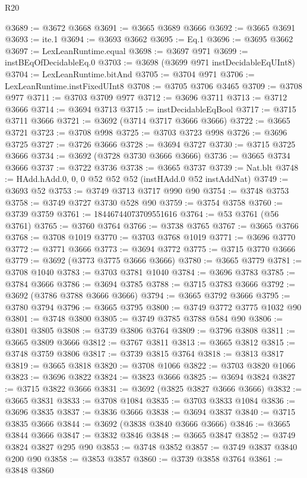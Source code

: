 \begin{lexlean}{R20}
\begin{coremodule}
@3689 := @3672 @3668
@3691 := @3665 @3689 @3666
@3692 := @3665 @3691
@3693 := ite.{1}
@3694 := @3693 @3662
@3695 := Eq.{1}
@3696 := @3695 @3662
@3697 := LexLeanRuntime.equal
@3698 := @3697 @971
@3699 := instBEqOfDecidableEq.{0}
@3703 := @3698 (@3699 @971 instDecidableEqUInt8)
@3704 := LexLeanRuntime.bitAnd
@3705 := @3704 @971
@3706 := LexLeanRuntime.instFixedUInt8
@3708 := @3705 @3706 @3465
@3709 := @3708 @977
@3711 := @3703 @3709 @977
@3712 := @3696 @3711
@3713 := @3712 @3666
@3714 := @3694 @3713
@3715 := instDecidableEqBool
@3717 := @3715 @3711 @3666
@3721 := @3692 (@3714 @3717 @3666 @3666)
@3722 := @3665 @3721
@3723 := @3708 @998
@3725 := @3703 @3723 @998
@3726 := @3696 @3725
@3727 := @3726 @3666
@3728 := @3694 @3727
@3730 := @3715 @3725 @3666
@3734 := @3692 (@3728 @3730 @3666 @3666)
@3736 := @3665 @3734 @3666
@3737 := @3722 @3736
@3738 := @3665 @3737
@3739 := Nat.blt
@3748 := HAdd.hAdd.{0, 0, 0} @52 @52 @52 (instHAdd.{0} @52 instAddNat)
@3749 := @3693 @52
@3753 := @3749 @3713 @3717 @990 @90
@3754 := @3748 @3753
@3758 := @3749 @3727 @3730 @528 @90
@3759 := @3754 @3758
@3760 := @3739 @3759
@3761 := 18446744073709551616
@3764 := @53 @3761 (@56 @3761)
@3765 := @3760 @3764
@3766 := @3738 @3765
@3767 := @3665 @3766
@3768 := @3708 @1019
@3770 := @3703 @3768 @1019
@3771 := @3696 @3770
@3772 := @3771 @3666
@3773 := @3694 @3772
@3775 := @3715 @3770 @3666
@3779 := @3692 (@3773 @3775 @3666 @3666)
@3780 := @3665 @3779
@3781 := @3708 @1040
@3783 := @3703 @3781 @1040
@3784 := @3696 @3783
@3785 := @3784 @3666
@3786 := @3694 @3785
@3788 := @3715 @3783 @3666
@3792 := @3692 (@3786 @3788 @3666 @3666)
@3794 := @3665 @3792 @3666
@3795 := @3780 @3794
@3796 := @3665 @3795
@3800 := @3749 @3772 @3775 @1032 @90
@3801 := @3748 @3800
@3805 := @3749 @3785 @3788 @584 @90
@3806 := @3801 @3805
@3808 := @3739 @3806 @3764
@3809 := @3796 @3808
@3811 := @3665 @3809 @3666
@3812 := @3767 @3811
@3813 := @3665 @3812
@3815 := @3748 @3759 @3806
@3817 := @3739 @3815 @3764
@3818 := @3813 @3817
@3819 := @3665 @3818
@3820 := @3708 @1066
@3822 := @3703 @3820 @1066
@3823 := @3696 @3822
@3824 := @3823 @3666
@3825 := @3694 @3824
@3827 := @3715 @3822 @3666
@3831 := @3692 (@3825 @3827 @3666 @3666)
@3832 := @3665 @3831
@3833 := @3708 @1084
@3835 := @3703 @3833 @1084
@3836 := @3696 @3835
@3837 := @3836 @3666
@3838 := @3694 @3837
@3840 := @3715 @3835 @3666
@3844 := @3692 (@3838 @3840 @3666 @3666)
@3846 := @3665 @3844 @3666
@3847 := @3832 @3846
@3848 := @3665 @3847
@3852 := @3749 @3824 @3827 @295 @90
@3853 := @3748 @3852
@3857 := @3749 @3837 @3840 @200 @90
@3858 := @3853 @3857
@3860 := @3739 @3858 @3764
@3861 := @3848 @3860

\end{coremodule}
\end{lexlean}
